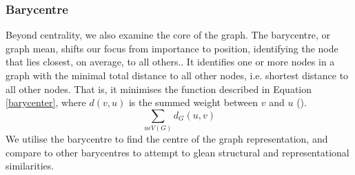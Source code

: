 \subsubsection{Barycentre}
Beyond centrality, we also examine the core of the graph. The barycentre, or graph mean, shifts our focus from importance to position, identifying the node that lies closest, on average, to all others.. It identifies one or more nodes in a graph with the minimal total distance to all other nodes, i.e. shortest distance to all other nodes. That is, it minimises the function described in Equation \ref{barycenter}, where $d(v,u)$ is the summed weight between $v$ and $u$ (\cite{BaryBook}).
\begin{equation}\label{barycenter}
\displaystyle\sum_{u\epsilon V(G)} d_G(u,v)
\end{equation}
We utilise the barycentre to find the centre of the graph representation, and compare to other barycentres to attempt to glean structural and representational similarities.